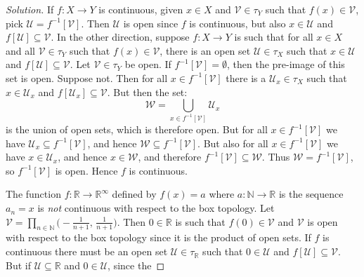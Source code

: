 \documentclass{article}
\theoremstyle{normal}
\begin{document}
    \begin{proof}[Solution]
        If $f:X\rightarrow{Y}$ is continuous, given $x\in{X}$ and
        $\mathcal{V}\in\tau_{Y}$ such that $f(x)\in\mathcal{V}$, pick
        $\mathcal{U}=f^{-1}[\mathcal{V}]$. Then $\mathcal{U}$ is open
        since $f$ is continuous, but also $x\in\mathcal{U}$ and
        $f[\mathcal{U}]\subseteq\mathcal{V}$. In the other direction, suppose
        $f:X\rightarrow{Y}$ is such that for all $x\in{X}$ and all
        $\mathcal{V}\in\tau_{Y}$ such that $f(x)\in\mathcal{V}$, there is an
        open set $\mathcal{U}\in\tau_{X}$ such that $x\in\mathcal{U}$ and
        $f[\mathcal{U}]\subseteq\mathcal{V}$. Let $\mathcal{V}\in\tau_{Y}$ be
        open. If $f^{-1}[\mathcal{V}]=\emptyset$, then the pre-image of this
        set is open. Suppose not. Then for all $x\in{f}^{-1}[\mathcal{V}]$ there
        is a $\mathcal{U}_{x}\in\tau_{X}$ such that $x\in\mathcal{U}_{x}$ and
        $f[\mathcal{U}_{x}]\subseteq\mathcal{V}$. But then the set:
        \begin{equation}
            \mathcal{W}=\bigcup_{x\in{f}^{-1}[\mathcal{V}]}\mathcal{U}_{x}
        \end{equation}
        is the union of open sets, which is therefore open. But
        for all $x\in{f}^{-1}[\mathcal{V}]$ we have
        $\mathcal{U}_{x}\subseteq{f}^{-1}[\mathcal{V}]$, and hence
        $\mathcal{W}\subseteq{f}^{-1}[\mathcal{V}]$. But also for all
        $x\in{f}^{-1}[\mathcal{V}]$ we have $x\in\mathcal{U}_{x}$, and hence
        $x\in\mathcal{W}$, and therefore
        $f^{-1}[\mathcal{V}]\subseteq\mathcal{W}$. Thus
        $\mathcal{W}=f^{-1}[\mathcal{V}]$, so $f^{-1}[\mathcal{V}]$ is open.
        Hence $f$ is continuous.
        \par\hfill\par
        The function $f:\mathbb{R}\rightarrow\mathbb{R}^{\infty}$ defined by
        $f(x)=a$ where $a:\mathbb{N}\rightarrow\mathbb{R}$ is the sequence
        $a_{n}=x$ is \textit{not} continuous with respect to the box topology.
        Let
        $\mathcal{V}=\prod_{n\in\mathbb{N}}\big(-\frac{1}{n+1},\,\frac{1}{n+1}\big)$.
        Then $0\in\mathbb{R}$ is such that $f(0)\in\mathcal{V}$ and
        $\mathcal{V}$ is open with respect to the box topology since it is the
        product of open sets. If $f$ is continuous there must be an open set
        $\mathcal{U}\in\tau_{\mathbb{R}}$ such that $0\in\mathcal{U}$ and
        $f[\mathcal{U}]\subseteq\mathcal{V}$. But if
        $\mathcal{U}\subseteq\mathbb{R}$ and $0\in\mathcal{U}$, since the

\end{proof}
\end{document}
